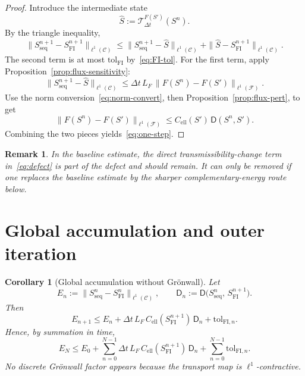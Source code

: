 \documentclass[11pt]{article}
\newtheorem{corollary}[theorem]{Corollary}
\newtheorem*{remark}{Remark}
\begin{document}
\begin{proof}
Introduce the intermediate state
\[
  \widehat{S} := \mathcal{T}^{F(S')}_{\Delta t}(S^n).
\]
By the triangle inequality,
\[
  \|S^{n+1}_{\mathrm{seq}} - S^{n+1}_{\mathrm{FI}}\|_{\ell^1(\mathcal{C})}
    \le \|S^{n+1}_{\mathrm{seq}} - \widehat{S}\|_{\ell^1(\mathcal{C})}
     +  \|\widehat{S} - S^{n+1}_{\mathrm{FI}}\|_{\ell^1(\mathcal{C})}.
\]
The second term is at most $\mathrm{tol}_{\mathrm{FI}}$
by~\eqref{eq:FI-tol}.  For the first term, apply
Proposition~\ref{prop:flux-sensitivity}:
\[
  \|S^{n+1}_{\mathrm{seq}} - \widehat{S}\|_{\ell^1(\mathcal{C})}
    \le \Delta t\,L_F\,\|F(S^n) - F(S')\|_{\ell^1(\mathcal{F})}.
\]
Use the norm conversion~\eqref{eq:norm-convert}, then
Proposition~\ref{prop:flux-pert}, to get
\[
  \|F(S^n) - F(S')\|_{\ell^1(\mathcal{F})}
    \le C_{\mathrm{ell}}(S')\,\mathsf{D}(S^n,S').
\]
Combining the two pieces yields~\eqref{eq:one-step}.
\end{proof}

\begin{remark}
In the baseline estimate, the direct transmissibility-change term
in~\eqref{eq:defect} is part of the defect and should remain.  It can only be
removed if one replaces the baseline estimate by the sharper
complementary-energy route below.
\end{remark}

\section{Global accumulation and outer iteration}\label{sec:global}

\begin{corollary}[Global accumulation without Gr\"onwall]\label{cor:global}
Let
\[
  E_n := \|S^n_{\mathrm{seq}} - S^n_{\mathrm{FI}}\|_{\ell^1(\mathcal{C})},
  \qquad
  \mathsf{D}_n := \mathsf{D}\bigl(S^n_{\mathrm{seq}},\,S^{n+1}_{\mathrm{FI}}\bigr).
\]
Then
\[
  E_{n+1} \le E_n
    + \Delta t\,L_F\,C_{\mathrm{ell}}(S^{n+1}_{\mathrm{FI}})\,\mathsf{D}_n
    + \mathrm{tol}_{\mathrm{FI},n}.
\]
Hence, by summation in time,
\begin{equation}\label{eq:global}
  E_N \le E_0
    + \sum_{n=0}^{N-1} \Delta t\,L_F\,
        C_{\mathrm{ell}}(S^{n+1}_{\mathrm{FI}})\,\mathsf{D}_n
    + \sum_{n=0}^{N-1} \mathrm{tol}_{\mathrm{FI},n}.
\end{equation}
No discrete Gr\"onwall factor appears because the transport map is
$\ell^1$-contractive.
\end{corollary}
\end{document}
